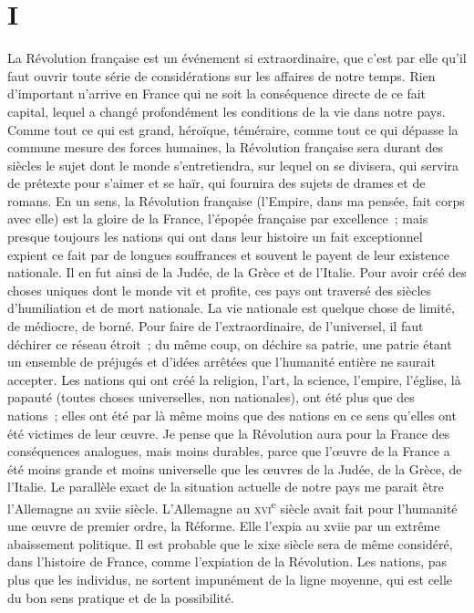 \documentclass[french,twoside]{book} %
\begin{document}
\section[{I}]{I}\renewcommand{\leftmark}{I}

\noindent La Révolution française est un événement si extraordinaire, que c’est par elle qu’il faut ouvrir toute série de considérations sur les affaires de notre temps. Rien d’important n’arrive en France qui ne soit la conséquence directe de ce fait capital, lequel a changé profondément les conditions de la vie dans notre pays. Comme tout ce qui est grand, héroïque, téméraire, comme tout ce qui dépasse la commune mesure des forces humaines, la Révolution française sera durant des siècles le sujet dont le monde s’entretiendra, sur lequel on se divisera, qui servira de prétexte pour s’aimer et se haïr, qui fournira des sujets de drames et de romans. En un sens, la Révolution française (l’Empire, dans ma pensée, fait corps avec elle) est la gloire de la France, l’épopée française par excellence ; mais presque toujours les nations qui ont dans leur histoire un fait exceptionnel expient ce fait par de longues souffrances et souvent le payent de leur existence nationale. Il en fut ainsi de la Judée, de la Grèce et de l’Italie. Pour avoir créé des choses uniques dont le monde vit et profite, ces pays ont traversé des siècles d’humiliation et de mort nationale. La vie nationale est quelque chose de limité, de médiocre, de borné. Pour faire de l’extraordinaire, de l’universel, il faut déchirer ce réseau étroit ; du même coup, on déchire sa patrie, une patrie étant un ensemble de préjugés et d’idées arrêtées que l’humanité entière ne saurait accepter. Les nations qui ont créé la religion, l’art, la science, l’empire, l’église, là papauté (toutes choses universelles, non nationales), ont été plus que des nations ; elles ont été par là même moins que des nations en ce sens qu’elles ont été victimes de leur œuvre. Je pense que la Révolution aura pour la France des conséquences analogues, mais moins durables, parce que l’œuvre de la France a été moins grande et moins universelle que les œuvres de la Judée, de la Grèce, de l’Italie. Le parallèle exact de la situation actuelle de notre pays me parait être l’Allemagne au xviie siècle. L’Allemagne au \textsc{xvi}\textsuperscript{e} siècle avait fait pour l’humanité une œuvre de premier ordre, la Réforme. Elle l’expia au xviie par un extrême abaissement politique. Il est probable que le xixe siècle sera de même considéré, dans l’histoire de France, comme l’expiation de la Révolution. Les nations, pas plus que les individus, ne sortent impunément de la ligne moyenne, qui est celle du bon sens pratique et de la possibilité.\par
\end{document}
